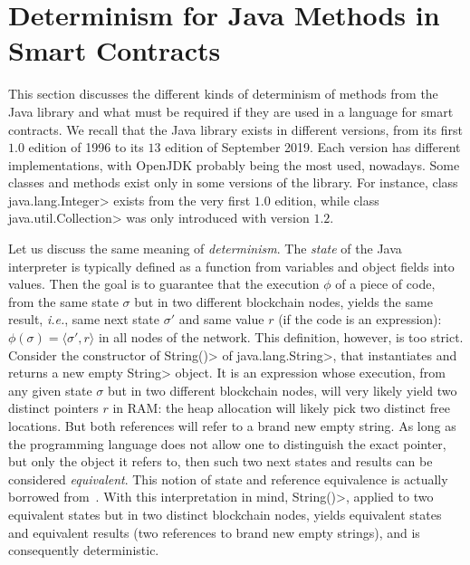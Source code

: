 \section{Determinism for Java Methods in Smart Contracts}\label{sec:determinism}

This section discusses the different kinds of determinism of methods from
the Java library and what must be required if they are used
in a language for smart contracts.
We recall that the Java library exists in different versions, from its first
$1.0$ edition of 1996 to its $13$ edition of September 2019.
Each version has different implementations, with OpenJDK probably being
the most used, nowadays. Some classes and methods exist only in some versions of the library.
For instance, class \<java.lang.Integer> exists from the very first $1.0$ edition,
while class \<java.util.Collection> was only introduced with version $1.2$.

Let us discuss the same meaning of \emph{determinism}.
The \emph{state} of the Java interpreter is typically defined
as a function from variables and object fields into values.
Then the goal is to guarantee that the execution $\phi$ of a piece of code,
from the same state $\sigma$ but in two different blockchain nodes, yields the same result, \emph{i.e.},
same next state $\sigma'$ and same value $r$ (if the code is an expression):
$\phi(\sigma)=\langle\sigma',r\rangle$ in all nodes of the network.
This definition, however, is too strict. Consider the constructor of
\<String()> of \<java.lang.String>, that instantiates and returns a new empty \<String>
object. It is an expression whose execution,
from any given state $\sigma$ but in two different blockchain nodes,
will very likely yield two distinct
pointers $r$ in RAM: the heap allocation will likely
pick two distinct free locations.
But both references will refer to a brand new empty string.
As long as the programming language does not allow one to distinguish
the exact pointer, but only the object it refers to,
then such two next states and results can be considered \emph{equivalent}.
This notion of state and reference equivalence is actually borrowed
from~\cite{BanerjeeN05,BarthePR13}.
With this interpretation in mind, \<String()>, applied to two equivalent
states but in two distinct blockchain nodes,
yields equivalent states and equivalent results (two references to
brand new empty strings), and is consequently deterministic.

